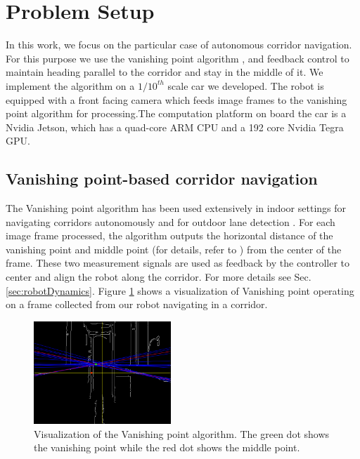\section{Problem Setup}

In this work, we focus on the particular case of autonomous corridor navigation. For this purpose we use the vanishing point algorithm \cite{VP1}, \cite{VP2} and feedback control to maintain heading parallel to the corridor and stay in the middle of it. We implement the algorithm on a $1/10^{th}$ scale car we developed. The robot is equipped with a front facing camera which feeds image frames to the vanishing point algorithm for processing.The computation platform on board the car is a Nvidia Jetson, which has a quad-core ARM CPU and a 192 core Nvidia Tegra GPU.


\subsection{Vanishing point-based corridor navigation}

The Vanishing point algorithm \cite{VP1} has been used extensively in indoor settings for navigating corridors autonomously \cite{VP2, VP3} and for outdoor lane detection \cite{gallagher2002ground}.
For each image frame processed, the algorithm outputs the horizontal distance of the vanishing point and middle point (for details, refer to \cite{VP1}) from the center of the frame. These two measurement signals are used as feedback by the controller to center and align the robot along the corridor. For more details see Sec. \ref{sec:robotDynamics}. Figure \ref{fig:vp_viz} shows a visualization of Vanishing point operating on a frame collected from our robot navigating in a corridor.

\begin{figure}[hbtp]
\centering
\includegraphics[width=0.46\textwidth]{Figs/vpmpimages/image_23_-30_-51.png}
\caption{Visualization of the Vanishing point algorithm. The green dot shows the vanishing point while the red dot shows the middle point.}
\label{fig:vp_viz} %
\end{figure}


